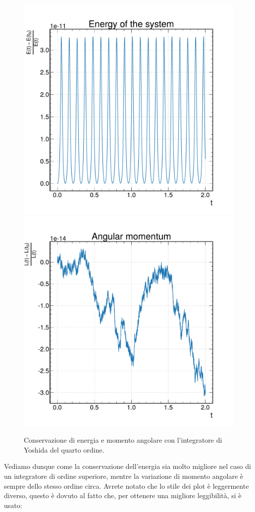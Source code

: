 \documentclass[10pt,a4paper]{article}
\begin{document}
\FloatBarrier
\begin{figure}[h]
\centering
\includegraphics[scale=0.3]{img/ene_yosh_simpl.pdf}
\includegraphics[scale=0.3]{img/ang_yosh_simpl.pdf}
\caption{Conservazione di energia e momento angolare con l'integratore di Yoshida del quarto ordine.}
\end{figure}
\FloatBarrier
Vediamo dunque come la conservazione dell'energia sia molto migliore nel caso di un integratore di ordine superiore, mentre la variazione di momento angolare è sempre dello stesso ordine circa. Avrete notato che lo stile dei plot è leggermente diverso, questo è dovuto al fatto che, per ottenere una migliore leggibilità, si è usato:
\end{document}

